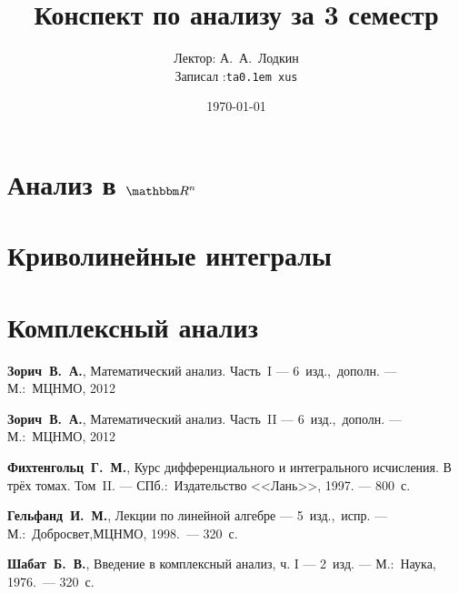 \documentclass[12pt,ebook]{../notes}
\title{Конспект по анализу за 3 семестр}
\date{\today}
\author{Лектор: А.~А.~Лодкин \\
Записал :\texttt{ta\lower 0.1em \hbox{x}us}}
\begin{document}
 
\maketitle
\tableofcontents
\clearpage

\chapter{Анализ в \texorpdfstring{$\R^n$}{}}

\chapter{Криволинейные интегралы}

\chapter{Комплексный анализ}


\begin{thebibliography}{9}
  \textbf{Зорич~В.~А.}, 
  Математический анализ. Часть~I ---
  6~изд.,~дополн. ---
  М.:~МЦНМО, 2012
  
  \textbf{Зорич~В.~А.}, 
  Математический анализ. Часть~II ---
  6~изд.,~дополн. ---
  М.:~МЦНМО, 2012
  
  \textbf{Фихтенгольц~Г.~М.}, 
  Курс дифференциального и интегрального исчисления. В трёх томах. Том~II. ---
  СПб.:~Издательство <<Лань>>, 1997. ---
  800~с.
  
  \textbf{Гельфанд~И.~М.}, 
  Лекции по линейной алгебре --- 5~изд.,~испр. ---
  М.:~Добросвет,МЦНМО, 1998.~---
  320~с.

  \textbf{Шабат~Б.~В.}, 
  Введение в комплексный анализ, ч. I --- 2~изд. ---
  М.:~Наука, 1976.~---
  320~с.
\end{thebibliography}
\end{document}
